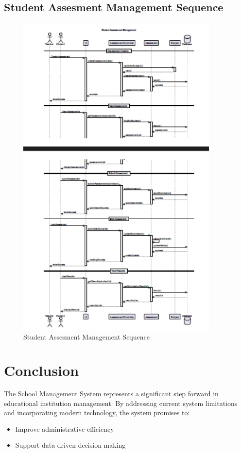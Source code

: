 \documentclass[12pt,a4paper]{report}
\begin{document}
\section{Student Assesment Management Sequence}
\begin{figure}[htbp]
    \centering
    \includegraphics[width=0.9\textwidth]{student-assesment-management-sequence.png}
    \caption{Student Assesment Management Sequence}
    \label{fig:student-assesment-management-sequence}
\end{figure}

\chapter{Conclusion}
The School Management System represents a significant step forward in educational institution management. By addressing current system limitations and incorporating modern technology, the system promises to:
\begin{itemize}
    \item Improve administrative efficiency
    \item Support data-driven decision making
\end{itemize}
\end{document}
